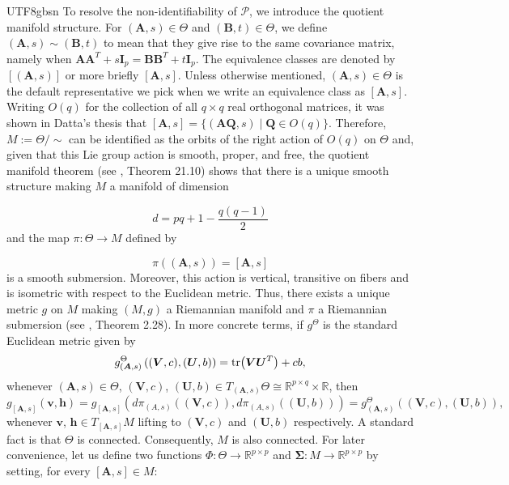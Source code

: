 \documentclass[12pt]{report}
\newcommand{\bracket}[1]{\left ( #1 \right )}
\theoremstyle{plain}
\theoremstyle{definition}
\begin{document}
\begin{CJK*}{UTF8}{gbsn}
To resolve the non-identifiability of $\mathcal{P}$,
we introduce the quotient manifold structure.
For $(\bm{A},s) \in \Theta$ and $(\bm{B}, t) \in \Theta$,
we define $(\bm{A},s) \sim (\bm{B}, t)$
to mean that they give rise to the same covariance matrix, namely when
$\bm{A}\bm{A}^T + s\bm{I}_p = \bm{B}\bm{B}^T + t\bm{I}_p$.
The equivalence classes are denoted by $[(\bm{A},s)]$
or more briefly $[\bm{A},s]$. 
Unless otherwise mentioned, $(\bm{A},s) \in \Theta$ is the default representative 
we pick when we write an equivalence class as $[\bm{A},s]$.
Writing $O(q)$ for the collection of all $q \times q$ real orthogonal matrices,
it was shown in Datta's thesis that 
$[\bm{A},s] = \{(\bm{A}\bm{Q},s) \mid \bm{Q} \in O(q)\}$.
Therefore, $M := \Theta / \sim$ can be identified as the orbits 
of the right action of $O(q)$ on $\Theta$
and, given that this Lie group action is smooth, proper, and free,
the quotient manifold theorem (see \citealp{Lee_2013}, Theorem 21.10) shows that there is a unique smooth 
structure making $M$ a manifold of dimension 

\begin{equation}\label{eq:d_def}
  d = pq+1-\frac{q(q-1)}{2}
\end{equation} 
and 
the map $\pi: \Theta \to M$ 
defined by

\begin{equation}\label{eq:pi_def}
  \pi((\bm{A},s)) = [\bm{A},s]
\end{equation}
is a smooth submersion.
Moreover, this action is vertical, transitive on fibers 
and is isometric with respect to the Euclidean metric.
Thus, there exists a unique metric $g$ on $M$ making
$(M,g)$ a Riemannian manifold and $\pi$ a Riemannian submersion
(see \citealp{Lee_2018}, Theorem 2.28).
In more concrete terms, 
if $g^{\Theta}$ is the standard Euclidean metric given by 
\begin{equation}\label{eq:euclidean_metric}
  g_{(\bm{A},s)}^{\Theta}\bracket{(\bm{V},c), (\bm{U},b)} = \tr(\bm{V}\bm{U}^T) + cb,
\end{equation}
whenever $(\bm{A},s) \in \Theta$, $(\bm{V},c)$, 
$(\bm{U},b) \in T_{(\bm{A},s)}\Theta \cong \mathbb{R}^{p \times q} \times \mathbb{R}$,
then 
\begin{equation}\label{eq:g_def}
  g_{[\bm{A},s]}(\bm{v}, \bm{h})
  = g_{[\bm{A},s]} \bracket{d\pi_{(A,s)}((\bm{V},c)), d\pi_{(A,s)}((\bm{U},b))}
  = g_{(\bm{A},s)}^{\Theta}\bracket{(\bm{V},c), (\bm{U},b)},
\end{equation}
whenever $\bm{v}$, $\bm{h} \in T_{[\bm{A},s]}M$
lifting to $(\bm{V},c)$ and $(\bm{U},b)$ respectively.
A standard fact is that $\Theta$ is connected.
Consequently, $M$ is also connected.
For later convenience,
let us define two functions $\Phi: \Theta \to \mathbb{R}^{p \times p}$
and $\bm{\Sigma}: M \to \mathbb{R}^{p \times p}$
by setting, for every $[\bm{A},s] \in M$:


\end{CJK*}
\end{document}

